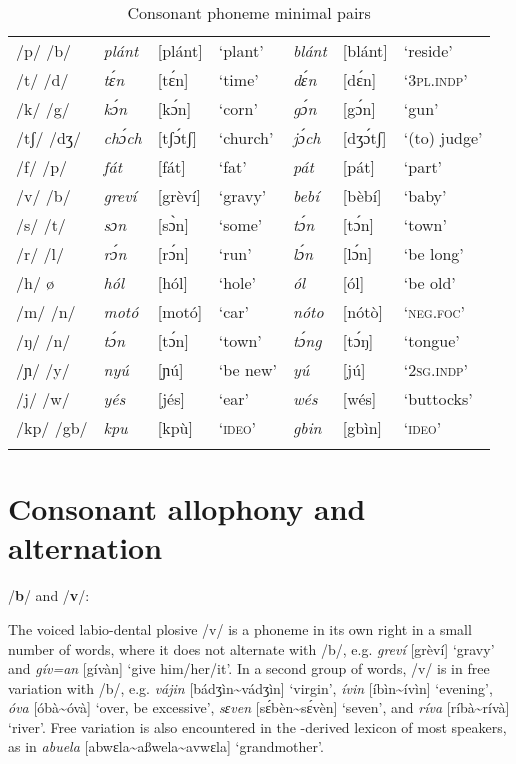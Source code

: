 \begin{table}
\caption{Consonant phoneme minimal pairs}
\label{tab:key:2.2}

\begin{tabularx}{\textwidth}{Qlll@{\qquad\qquad} lll}
\lsptoprule
/p/  /b/ & \itshape plánt & [plánt] & ‘plant’ & \itshape blánt & [blánt] & ‘reside’\\
/t/  /d/ & \itshape tɛ́n & [tɛ́n] & ‘time’ & \itshape dɛ́n & [dɛ́n] & ‘\textsc{3pl.indp}’\\
/k/  /g/ & \itshape kɔ́n & [kɔ́n] & ‘corn’ & \itshape gɔ́n & [gɔ́n] & ‘gun’\\
/tʃ/  /dʒ/ & \itshape chɔ́ch & [tʃɔ́tʃ] & ‘church’ & \itshape jɔ́ch & [dʒɔ́tʃ] & ‘(to) judge’\\
/f/  /p/ & \itshape fát & [fát] & ‘fat’ & \itshape pát & [pát] & ‘part’\\
/v/  /b/ & \itshape greví & [grèví] & ‘gravy’ & \itshape bebí & [bèbí] & ‘baby’\\
/s/  /t/ & \itshape sɔn & [sɔ̀n] & ‘some’ & \itshape tɔ́n & [tɔ́n] & ‘town’\\
/r/  /l/ & \itshape rɔ́n & [rɔ́n] & ‘run’ & \itshape lɔ́n & [lɔ́n] & ‘be long’\\
/h/  ø & \itshape hól & [hól] & ‘hole’ & \itshape ól & [ól] & ‘be old’\\
/m/  /n/ & \itshape motó & [motó] & ‘car’ & \itshape nóto & [nótò] & ‘\textsc{neg}.\textsc{foc}’\\
/ŋ/  /n/ & \itshape tɔ́n & [tɔ́n] & ‘town’ & \itshape tɔ́ng & [tɔ́ŋ] & ‘tongue’\\
/ɲ/  /y/ & \itshape nyú & [ɲú] & ‘be new’ & \itshape yú & [jú] & ‘\textsc{2sg.indp}’\\
/j/  /w/ & \itshape yés & [jés] & ‘ear’ & \itshape wés & [wés] & ‘buttocks’\\
/kp/ /gb/ & \itshape kpu & [kpù] & ‘\textsc{ideo}’ & \itshape gbin & [gbìn] & ‘\textsc{ideo}’\\
\lspbottomrule
\end{tabularx}
\end{table}
\section{Consonant allophony and alternation}\label{sec:2.2}

/\textbf{b}/ and /\textbf{v}/:

The voiced labio-dental plosive /v/ is a phoneme in its own right in a small number of words, where it does not alternate with /b/, e.g. \textit{greví} [grèví] ‘gravy’ and \textit{gív=an} [gívàn] ‘give him/her/it’. In a second group of words, /v/ is in free variation with /b/, e.g. \textit{vájin} [bádʒìn{\textasciitilde}vádʒìn] ‘virgin’, \textit{ívin} [íbìn{\textasciitilde}ívìn] ‘evening’, \textit{óva} [óbà{\textasciitilde}óvà] ‘over, be excessive’, \textit{sɛven} [sɛ́bèn{\textasciitilde}sɛ́vèn] ‘seven’, and \textit{ríva} [ríbà{\textasciitilde}rívà] ‘river’. Free variation is also encountered in the -derived lexicon of most speakers, as in \textit{abuela} [abwɛla{\textasciitilde}aßwela{\textasciitilde}avwɛla] ‘grandmother’. 


